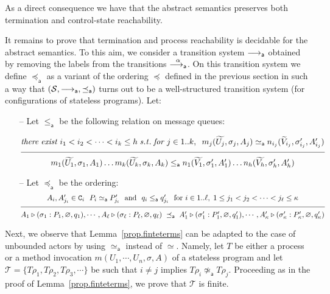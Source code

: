 \documentclass{LMCS}
\newcommand{\cal}{\mathcal}
\theoremstyle{plain}\newtheorem{proposition}[thm]{Proposition}
\theoremstyle{plain}\newtheorem{lemma}[thm]{Lemma}
\theoremstyle{plain}\newtheorem{theorem}[thm]{Theorem}
\theoremstyle{plain}\newtheorem{corollary}[thm]{Corollary}
\newif\ifconf \conffalse
\newcommand{\bigfract}[2]{\frac{^{\textstyle #1}}{_{\textstyle #2}}}
\newcommand{\wt}[1]{\widetilde{#1}}
\newcommand{\adef}[1]{{\tt #1}}
\begin{document}
\noindent As a direct consequence we have that the abstract semantics preserves
both termination and 
control-state reachability.
\fi
\ifconf
\fi
It remains to prove that termination and process reachability is
decidable for the abstract semantics. To this aim, we consider
a transition system $\stackrel{}{\longrightarrow_{\mathsf a}}$ obtained by removing the 
labels from the transitions $\stackrel{\alpha}{\longrightarrow_{\mathsf a}}$.
On this transition system we 
define $\preceq_{\mathsf a}$ as
a variant of the ordering
$\preceq$ defined in the previous section
in such a way that $({\cal S},\absred{},\preceq_{\mathsf a})$
turns out to be a well-structured transition system (for configurations 
of stateless programs). 
Let:
\begin{itemize}
\item[--]
Let $\leq_{\mathsf a}$ be the following relation on message queues:


{\small
\[
\bigfract{
	{\it there \; exist} \; i_1 < i_2 < \cdots < i_k \leq h \; 
	{\it s.t. \; for} \; j \in 1..k,  \; \; m_j(\wt{U_j},\sigma_j,A_j) 
	\simeq_{\mathsf a} n_{i_j}(\wt{V}_{i_j},\sigma'_{i_j},A'_{i_j})
	}{
	m_1(\wt{U_1},\sigma_1,A_1) \ldots m_k(\wt{U_k},\sigma_k,A_k) \leq_{\mathsf a} 
	n_1(\wt{V_1},\sigma'_1,A'_1) \ldots n_h(\wt{V_h},\sigma'_h,A'_h)
	}
\]
}

\item[--]
Let $\preceq_{\mathsf a}$ be the ordering:
\[
\bigfract{A_i,A'_{j_i} \in {\adef{C}_i} \ \ P_i \simeq_{\mathsf a} P_{j_i}'
\ \  \mbox{\rm and}  
	\ \ q_i \leq_{\mathsf a} q_{j_i}' \ \ \mbox{\rm for } {i \in 1..\ell}, \; 
	1 \leq j_1 < j_2 < \cdots < j_\ell \leq \kappa
	}{
	 A_1 \triangleright (\sigma_1:P_1, \varnothing, q_1), \cdots , A_\ell \triangleright (\sigma_\ell:P_\ell, \varnothing, q_\ell) 
 \; \preceq_{\mathsf a} \; A'_1 \triangleright (\sigma'_1:P_1', \varnothing, q_1'), \cdots , A'_\kappa \triangleright 
 (\sigma'_\kappa:P_\kappa', \varnothing, q_\kappa')
 }
\]


\end{itemize}

Next, we observe that Lemma~\ref{prop.finteterms}
can be adapted to the case of unbounded actors
by using $\simeq_{\mathsf a}$ instead of $\simeq$.
Namely, let $T$ be either a process or a method invocation $m(U_1, \cdots , U_n, \sigma, A)$
of a stateless program and
let ${\cal T} = \{ T \rho_1, T\rho_2, T\rho_3, \cdots \}$ be
such that $i \neq j$ implies $T \rho_i \not \simeq_{\mathsf a} T \rho_j$. 
Proceeding as in the proof of Lemma~\ref{prop.finteterms},
we prove that
${\cal T}$ is finite.
\end{document}
